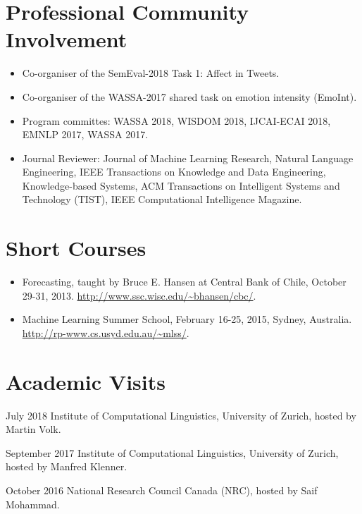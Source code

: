 \documentclass[letterpaper]{article}
\begin{document}
\section{Professional Community Involvement}
\begin{itemize}
  \item Co-organiser of the SemEval-2018 Task 1: Affect in Tweets.
  \item Co-organiser of the WASSA-2017 shared task on emotion intensity (EmoInt).
  \item Program committes: WASSA 2018, WISDOM 2018, IJCAI-ECAI 2018, EMNLP 2017, WASSA 2017.
  \item Journal Reviewer:  Journal of Machine Learning Research, Natural Language Engineering, IEEE Transactions on Knowledge and Data Engineering, Knowledge-based Systems, ACM Transactions on Intelligent Systems and Technology (TIST), IEEE Computational Intelligence Magazine.
 \end{itemize}
 
\section{Short Courses}
\begin{itemize}
 \item Forecasting, taught by Bruce E. Hansen at Central Bank of Chile, October 29-31, 2013. \url{http://www.ssc.wisc.edu/~bhansen/cbc/}.
 \item Machine Learning Summer School, February 16-25, 2015, Sydney, Australia. \url{http://rp-www.cs.usyd.edu.au/~mlss/}.
 \end{itemize} 
 
\section{Academic Visits}
\begin{CV}
\item [July 2018] Institute of Computational Linguistics, University of Zurich, hosted by Martin Volk.
\item [September 2017] Institute of Computational Linguistics, University of Zurich, hosted by Manfred Klenner.
\item [October 2016] National Research Council Canada (NRC), hosted by Saif Mohammad.
\end{CV} 
 
 
\end{document}
